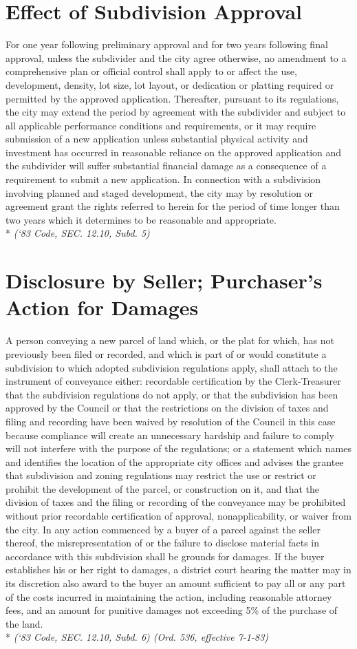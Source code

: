 \section{Effect of Subdivision Approval}
For one year following preliminary approval and for two years following final approval, unless the subdivider and the city agree otherwise, no amendment to a comprehensive plan or official control shall apply to or affect the use, development, density, lot size, lot layout, or dedication or platting required or permitted by the approved application. Thereafter, pursuant to its regulations, the city may extend the period by agreement with the subdivider and subject to all applicable performance conditions and requirements, or it may require submission of a new application unless substantial physical activity and investment has occurred in reasonable reliance on the approved application and the subdivider will suffer substantial financial damage as a consequence of a requirement to submit a new application. In connection with a subdivision involving planned and staged development, the city may by resolution or agreement grant the rights referred to herein for the period of time longer than two years which it determines to be reasonable and appropriate.\\*
\emph{(‘83 Code, SEC. 12.10, Subd. 5)}
\section{Disclosure by Seller; Purchaser’s Action for Damages}
A person conveying a new parcel of land which, or the plat for which, has not previously been filed or recorded, and which is part of or would constitute a subdivision to which adopted subdivision regulations apply, shall attach to the instrument of conveyance either: recordable certification by the Clerk-Treasurer that the subdivision regulations do not apply, or that the subdivision has been approved by the Council or that the restrictions on the division of taxes and filing and recording have been waived by resolution of the Council in this case because compliance will create an unnecessary hardship and failure to comply will not interfere with the purpose of the regulations; or a statement which names and identifies the location of the appropriate city offices and advises the grantee that subdivision and zoning regulations may restrict the use or restrict or prohibit the development of the parcel, or construction on it, and that the division of taxes and the filing or recording of the conveyance may be prohibited without prior recordable certification of approval, nonapplicability, or waiver from the city. In any action commenced by a buyer of a parcel against the seller thereof, the misrepresentation of or the failure to disclose material facts in accordance with this subdivision shall be grounds for damages.  If the buyer establishes his or her right to damages, a district court hearing the matter may in its discretion also award to the buyer an amount sufficient to pay all or any part of the costs incurred in maintaining the action, including reasonable attorney fees, and an amount for punitive damages not exceeding 5\% of the purchase of the land.\\*
\emph{(‘83 Code, SEC. 12.10, Subd. 6)  (Ord. 536, effective 7-1-83)}
